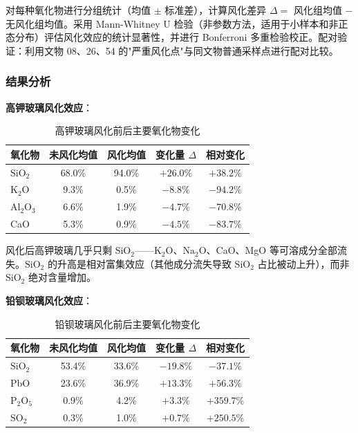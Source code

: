 对每种氧化物进行分组统计（均值 $\pm$ 标准差），计算风化差异 $\Delta =$ 风化组均值 $-$ 无风化组均值。采用 Mann-Whitney U 检验（非参数方法，适用于小样本和非正态分布）评估风化效应的统计显著性，并进行 Bonferroni 多重检验校正。配对验证：利用文物 08、26、54 的"严重风化点"与同文物普通采样点进行配对比较。

\subsubsection{结果分析}

\textbf{高钾玻璃风化效应}：

\begin{table}[H]
    \centering
    \caption{高钾玻璃风化前后主要氧化物变化}
    \label{tab:hk_weathering}
    \begin{tabular}{l c c c c}
        \toprule
        \textbf{氧化物} & \textbf{未风化均值} & \textbf{风化均值} & \textbf{变化量 $\Delta$} & \textbf{相对变化} \\
        \midrule
        $\text{SiO}_2$ & 68.0\% & 94.0\% & \textbf{$+26.0\%$} & $+38.2\%$ \\
        $\text{K}_2\text{O}$ & 9.3\% & 0.5\% & \textbf{$-8.8\%$} & $-94.2\%$ \\
        $\text{Al}_2\text{O}_3$ & 6.6\% & 1.9\% & $-4.7\%$ & $-70.8\%$ \\
        CaO & 5.3\% & 0.9\% & $-4.5\%$ & $-83.7\%$ \\
        \bottomrule
    \end{tabular}
\end{table}

风化后高钾玻璃几乎只剩 $\text{SiO}_2$——$\text{K}_2\text{O}$、$\text{Na}_2\text{O}$、CaO、MgO 等可溶成分全部流失。$\text{SiO}_2$ 的升高是相对富集效应（其他成分流失导致 $\text{SiO}_2$ 占比被动上升），而非 $\text{SiO}_2$ 绝对含量增加。

\textbf{铅钡玻璃风化效应}：

\begin{table}[H]
    \centering
    \caption{铅钡玻璃风化前后主要氧化物变化}
    \label{tab:pb_weathering}
    \begin{tabular}{l c c c c}
        \toprule
        \textbf{氧化物} & \textbf{未风化均值} & \textbf{风化均值} & \textbf{变化量 $\Delta$} & \textbf{相对变化} \\
        \midrule
        $\text{SiO}_2$ & 53.4\% & 33.6\% & \textbf{$-19.8\%$} & $-37.1\%$ \\
        PbO & 23.6\% & 36.9\% & \textbf{$+13.3\%$} & $+56.3\%$ \\
        $\text{P}_2\text{O}_5$ & 0.9\% & 4.2\% & $+3.3\%$ & $+359.7\%$ \\
        $\text{SO}_2$ & 0.3\% & 1.0\% & $+0.7\%$ & $+250.5\%$ \\
        \bottomrule
    \end{tabular}
\end{table}

